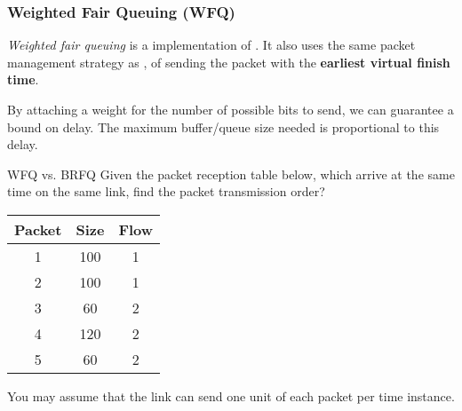 \subsubsection{Weighted Fair Queuing (WFQ)}\label{subsubsec:Weighted_Fair_Queuing}
\begin{definition}\label{def:Weighted_Fair_Queuing}
  \emph{Weighted fair queuing} is a  implementation of .
  It also uses the same packet management strategy as , of sending the packet with the \textbf{earliest virtual finish time}.

  By attaching a weight for the number of possible bits to send, we can guarantee a bound on delay.
  The maximum buffer/queue size needed is proportional to this delay.
\end{definition}

\begin{example}[Lecture 5]{WFQ vs. BRFQ}
  Given the packet reception table below, which arrive at the same time on the same link, find the packet transmission order?
  \begin{center}
    \begin{tabular}{ccc}
      \toprule
      Packet & Size & Flow \\
      \midrule
      1 & 100 & 1 \\
      2 & 100 & 1 \\
      3 & 60 & 2 \\
      4 & 120 & 2 \\
      5 & 60 & 2 \\
      \bottomrule
    \end{tabular}
\end{center}


  You may assume that the link can send one unit of each packet per time instance.
  \tcblower{}
\end{example}

